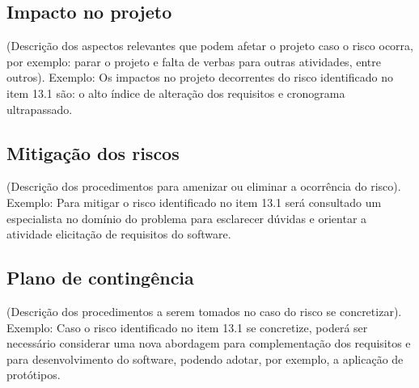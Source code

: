 \subsection{Impacto no projeto}
(Descrição dos aspectos relevantes que podem afetar o projeto caso o
risco ocorra, por exemplo: parar o projeto e falta de verbas para outras
atividades, entre outros).
Exemplo: Os impactos no projeto decorrentes do risco identificado no
item 13.1 são: o alto índice de alteração dos requisitos e cronograma
ultrapassado.

\subsection{Mitigação dos riscos}
(Descrição dos procedimentos para amenizar ou eliminar a ocorrência
do risco).
Exemplo: Para mitigar o risco identificado no item 13.1 será consultado um
especialista no domínio do problema para esclarecer dúvidas e orientar a
atividade elicitação de requisitos do software.

\subsection{Plano de contingência}
(Descrição dos procedimentos a serem tomados no caso do risco
se concretizar).
Exemplo: Caso o risco identificado no item 13.1 se concretize, poderá ser
necessário considerar uma nova abordagem para complementação dos
requisitos e para desenvolvimento do software, podendo adotar, por exemplo,
a aplicação de protótipos.


